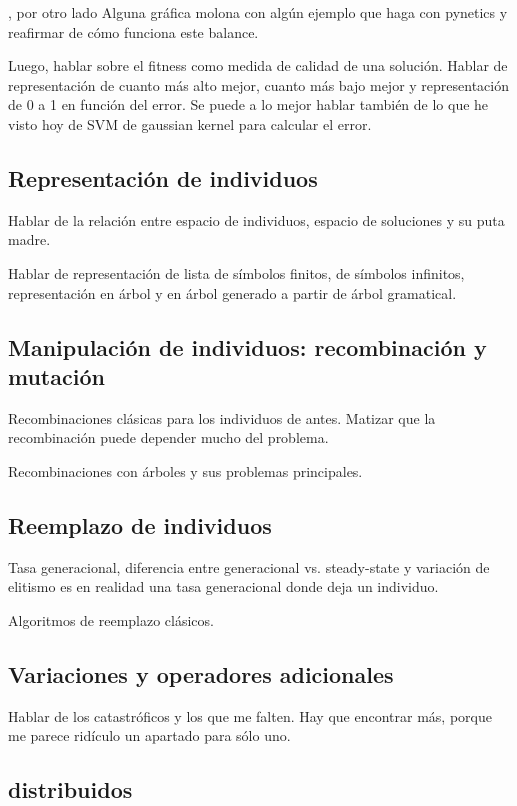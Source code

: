 , por otro lado
Alguna gráfica molona con algún ejemplo que haga con pynetics y reafirmar de cómo funciona este balance.

Luego, hablar sobre el fitness como medida de calidad de una solución. Hablar de representación de cuanto más alto mejor, cuanto más bajo mejor y representación de 0 a 1 en función del error. Se puede a lo mejor hablar también de lo que he visto hoy de SVM de gaussian kernel para calcular el error.

\subsection{Representación de individuos}

Hablar de la relación entre espacio de individuos, espacio de soluciones y su puta madre.

Hablar de representación de lista de símbolos finitos, de símbolos infinitos, representación en árbol y en árbol generado a partir de árbol gramatical.

\subsection{Manipulación de individuos: recombinación y mutación}

Recombinaciones clásicas para los individuos de antes. Matizar que la recombinación puede depender mucho del problema.

Recombinaciones con árboles y sus problemas principales.

\subsection{Reemplazo de individuos}

Tasa generacional, diferencia entre generacional vs. steady-state y variación de elitismo es en realidad una tasa generacional donde deja un individuo.

Algoritmos de reemplazo clásicos.

\subsection{Variaciones y operadores adicionales}

Hablar de los catastróficos y los que me falten. Hay que encontrar más, porque me parece ridículo un apartado para sólo uno.

\subsection{ distribuidos}

